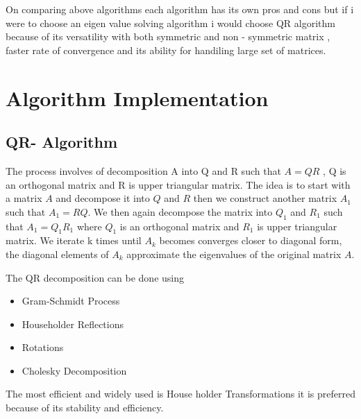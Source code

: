 \documentclass[pdflatex,sn-mathphys-num]{sn-jnl}
\begin{document}
On comparing above algorithms each algorithm has its own pros and cons but if i were to choose an eigen value solving algorithm i would choose QR algorithm because of its versatility with both symmetric and non - symmetric matrix , faster rate of convergence and its ability for handiling large set of matrices.

\section*{Algorithm Implementation}
\subsection*{QR- Algorithm}
The process involves of decomposition A into Q and R such that $A=QR$ , Q is an orthogonal matrix and R is upper triangular matrix. The idea is to start with a matrix $A$ and decompose it into $Q$ and $R$ then we construct another matrix $A_1$ such that $A_1 = RQ$. We then again decompose the matrix into $Q_1$ and $R_1$ such that $A_1=Q_1R_1$ where  $Q_1$ is an orthogonal matrix and $R_1$ is upper triangular matrix. We iterate k times until $A_k$ becomes converges closer to diagonal form, the diagonal elements of $A_k$ approximate the eigenvalues of the original matrix $A$.

    The QR decomposition can be done using  
     \begin{itemize}
\item Gram-Schmidt Process
\item  Householder Reflections
\item  Rotations
\item  Cholesky Decomposition
\end{itemize}
 The most efficient and widely used is House holder Transformations it is preferred because of its stability and efficiency.
\end{document}
